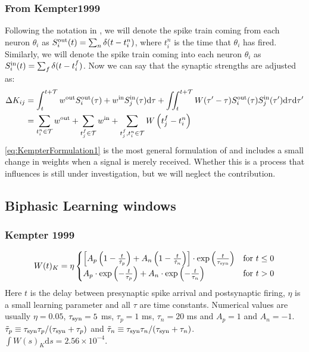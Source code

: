 \subsubsection{From Kempter1999}
Following the notation in \cite{Kempter1999}, we will denote the spike train coming from each neuron $\theta_i$ as $S_i^{\rm out}(t) = \sum_{n} \delta (t-t_{i}^{n})$, where $t_{i}^{n}$ is the time that $\theta_i$ has fired. Similarly, we will denote the spike train coming into each neuron $\theta_i$ as $S_i^{\rm in}(t) = \sum_{f} \delta (t-t_{i}^{f})$. Now we can say that the synaptic strengths are adjusted as:
\begin{align}
\Delta K_{ij} &= \int_{t}^{t+\mathcal{T}} w^{\rm{out}} S_i^{\rm out}(\tau) + w^{\rm{in}} S_{j}^{\rm {in}}(\tau) \mathrm{d}\tau
+ \iint_{t}^{t+\mathcal{T}} W( \tau^\prime - \tau) S_{i}^{\rm out}(\tau) S_{j}^{\rm in}( \tau^\prime) \mathrm{d} \tau \mathrm{d} \tau^\prime
\label{eq:KempterFormulation1} \\
&= \sum_{t_i^{n}\in \mathcal{T}} w^{\mathrm{out}} + \sum_{t_{j}^{f} \in \mathcal{T}} w^{\mathrm{in}} + \sum_{t_{j}^{f}, t_i^{n} \in \mathcal{T}} W\left(t_{j}^{f}-t_i^{n}\right) \label{eq:KempterFormulation2}
\end{align}
\eqref{eq:KempterFormulation1} is the most general formulation of \STDP and includes a small change in weights when a signal is merely received. Whether this is a process that influences \STDP is still under investigation, but we will neglect the contribution.


\subsection{Biphasic Learning windows}
\subsubsection{Kempter 1999}
\begin{align}
W(t)_K = \eta
\begin{cases}
\left[A_{p}\left(1-\frac{t}{\tilde{\tau}_{p}}\right)+A_{n}\left(1-\frac{t}{\tilde{\tau}_{n}}\right)\right] \cdot \exp \left( \frac{t}{\tau_{\rm syn}} \right) & \text{for } t \leq 0 \\
A_{p} \cdot \exp \left(-\frac{t}{\tau_{p}}\right) + A_{n} \cdot \exp \left(-\frac{t}{\tau_{n}} \right) & \text{for } t > 0
\end{cases} \label{eq:learningwindowKempter1999}
\end{align}
Here $t$ is the delay between presynaptic spike arrival and postsynaptic firing, $\eta$ is a small learning parameter and all $\tau$ are time constants. Numerical values are usually  $\eta = 0.05$, $\tau_{\rm syn} = 5$ ms, $\tau_{p} = 1$ ms, $\tau_{n} = 20$ ms and $A_p = 1$ and $A_{n} = -1$. $\tilde{\tau}_{p} \equiv \tau_{\rm syn} \tau_{p} / (\tau_{\rm syn} + \tau_{p})$ and $\tilde{\tau}_{n} \equiv \tau_{\rm syn} \tau_{n} / (\tau_{\rm syn} + \tau_{n})$. \\
$\int W(s)_K \mathrm{d}s = 2.56 \times 10^{-4}$.


